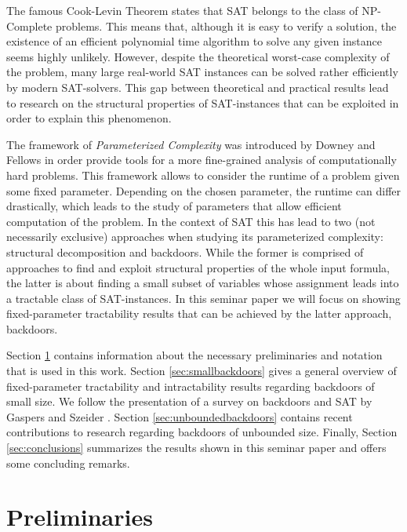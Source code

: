 \documentclass[11pt,a4paper]{article}
\theoremstyle{definition}
\theoremstyle{proposition}
\begin{document}
The famous Cook-Levin Theorem \cite{Cook71, Levin73} states that SAT belongs to the class of NP-Complete problems. This means that, although it is easy to verify a solution, the existence of an efficient polynomial time algorithm to solve any given instance seems highly unlikely. However, despite the theoretical worst-case complexity of the problem, many large real-world SAT instances can be solved rather efficiently by modern SAT-solvers. This gap between theoretical and practical results lead to research on the structural properties of SAT-instances that can be exploited in order to explain this phenomenon. 

The framework of \emph{Parameterized Complexity} was introduced by Downey and Fellows \cite{downeyFellows} in order provide tools for a more fine-grained analysis of computationally hard problems. This framework allows to consider the runtime of a problem given some fixed parameter. Depending on the chosen parameter, the runtime can differ drastically, which leads to the study of parameters that allow efficient computation of the problem. In the context of SAT this has lead to two (not necessarily exclusive) approaches when studying its parameterized complexity: structural decomposition and backdoors. While the former is comprised of approaches to find and exploit structural properties of the whole input formula, the latter is about finding a small subset of variables whose assignment leads into a tractable class of SAT-instances. In this seminar paper we will focus on showing fixed-parameter tractability results that can be achieved by the latter approach, backdoors. 

Section \ref{sec:preliminaries} contains information about the necessary preliminaries and notation that is used in this work. Section \ref{sec:smallbackdoors} gives a general overview of fixed-parameter tractability and intractability results regarding backdoors of small size. We follow the presentation of a survey on backdoors and SAT by Gaspers and Szeider \cite{Gaspers2012}. Section \ref{sec:unboundedbackdoors} contains recent contributions to research regarding backdoors of unbounded size. Finally, Section \ref{sec:conclusions} summarizes the results shown in this seminar paper and offers some concluding remarks. 



\section{Preliminaries}
\label{sec:preliminaries}
\end{document}

